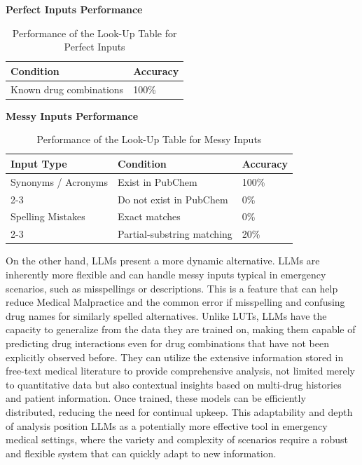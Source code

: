 \documentclass[11pt]{article}
\begin{document}
\begin{table}[ht]
\centering
\caption{Performance of the Look-Up Table for Perfect Inputs}
\label{table:perfect_inputs}
\textbf{Perfect Inputs Performance}
\par\medskip %
\begin{tabular}{|p{4cm}|p{2cm}|}
\hline
\textbf{Condition} & \textbf{Accuracy} \\
\hline
Known drug combinations & 100\% \\
\hline
\end{tabular}
\end{table}

\begin{table}[ht]
\centering
\caption{Performance of the Look-Up Table for Messy Inputs}
\label{table:messy_inputs}
\textbf{Messy Inputs Performance}
\par\medskip %
\begin{tabular}{|p{2cm}|p{2.5cm}|p{1.5cm}|}
\hline
\textbf{Input Type} & \textbf{Condition} & \textbf{Accuracy} \\
\hline
Synonyms / Acronyms & Exist in PubChem & 100\% \\
\cline{2-3}
 & Do not exist in PubChem & 0\% \\
\hline
Spelling Mistakes & Exact matches & 0\% \\
\cline{2-3}
 & Partial-substring matching & 20\% \\
\hline
\end{tabular}
\end{table}

On the other hand, LLMs present a more dynamic alternative. LLMs are inherently more flexible and can handle messy inputs typical in emergency scenarios, such as misspellings or descriptions. This is a feature that can help reduce Medical Malpractice and the common error if misspelling and confusing drug names for similarly spelled alternatives. Unlike LUTs, LLMs have the capacity to generalize from the data they are trained on, making them capable of predicting drug interactions even for drug combinations that have not been explicitly observed before. They can utilize the extensive information stored in free-text medical literature to provide comprehensive analysis, not limited merely to quantitative data but also contextual insights based on multi-drug histories and patient information. Once trained, these models can be efficiently distributed, reducing the need for continual upkeep. This adaptability and depth of analysis position LLMs as a potentially more effective tool in emergency medical settings, where the variety and complexity of scenarios require a robust and flexible system that can quickly adapt to new information.
\end{document}
